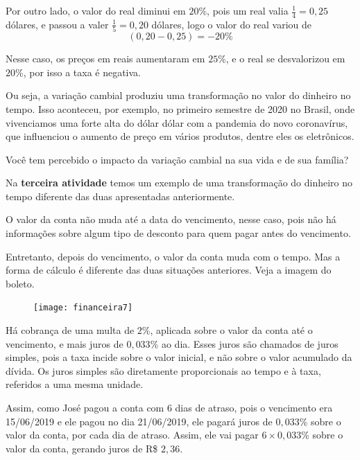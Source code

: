 Por outro lado, o valor do real diminui em $20$\%, pois um real valia $\frac{1}{4}=0{,}25$ dólares, e passou a valer $\frac{1}{5}=0{,}20$ dólares, logo o valor do real variou de 
\begin{equation*}
(0{,}20-0{,}25)=-20\%
\end{equation*}

Nesse caso, os preços em reais aumentaram em $25$\%, e o real se desvalorizou em $20$\%, por isso a taxa é negativa.

Ou seja, a variação cambial produziu uma transformação no valor do dinheiro no tempo. Isso aconteceu, por exemplo, no primeiro semestre de 2020 no Brasil, onde vivenciamos uma forte alta do dólar dólar com a pandemia do novo coronavírus, que influenciou o aumento de preço em vários produtos, dentre eles os eletrônicos.

\begin{observation}{}
{Você tem percebido o impacto da variação cambial na sua vida e de sua família?}
\end{observation}

Na \textbf{terceira atividade} temos um exemplo de uma transformação do dinheiro no tempo diferente das duas apresentadas anteriormente.

O valor da conta não muda até a data do vencimento, nesse caso, pois não há informações sobre algum tipo de desconto para quem pagar antes do vencimento.

Entretanto, depois do vencimento, o valor da conta muda com o tempo. Mas a forma de cálculo é diferente das duas situações anteriores. Veja a imagem do boleto.

\begin{figure}[H]
\centering

\texttt{[image: financeira7]}
\end{figure}

Há cobrança de uma multa de $2$\%, aplicada sobre o valor da conta até o vencimento, e mais juros de $0{,}033$\% ao dia. Esses juros são chamados de juros simples, pois a taxa incide sobre o valor inicial, e não sobre o valor acumulado da dívida. Os juros simples são diretamente proporcionais ao tempo e à taxa, referidos a uma mesma unidade.

Assim, como José pagou a conta com 6 dias de atraso, pois o vencimento era 15/06/2019 e ele pagou no dia 21/06/2019, ele pagará juros de $0{,}033$\% sobre o valor da conta, por cada dia de atraso. Assim, ele vai pagar $6\times0{,}033$\% sobre o valor da conta, gerando juros de R\$ $2{,}36$.

